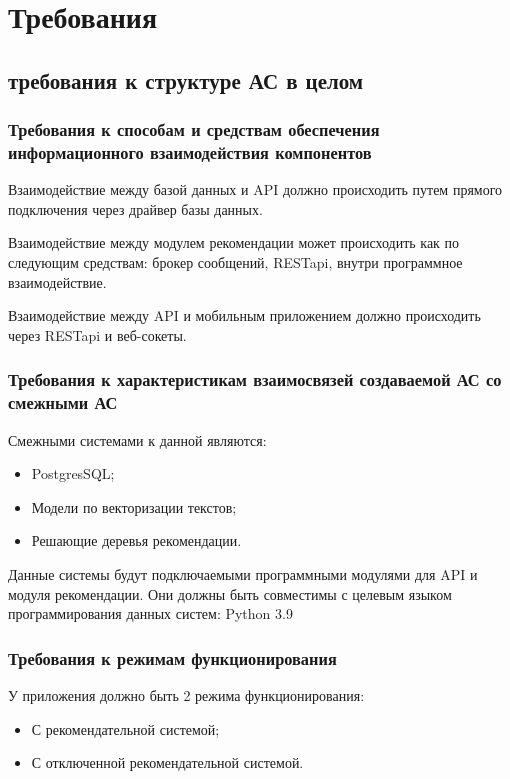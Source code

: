 
\section{Требования}\label{sec:treb}
\subsection{требования к структуре АС в целом}\label{subsec:treb:ob}
\subsubsection{Требования к способам и средствам обеспечения информационного взаимодействия компонентов}
Взаимодействие между базой данных и API должно происходить путем прямого подключения через драйвер базы данных.

Взаимодействие между модулем рекомендации может происходить как по следующим средствам: брокер сообщений, RESTapi,
внутри программное взаимодействие.

Взаимодействие между API и мобильным приложением должно происходить через RESTapi и веб-сокеты.

\subsubsection{Требования к характеристикам взаимосвязей создаваемой АС со смежными АС}
Смежными системами к данной являются:
\begin{itemize}
    \item PostgresSQL;
    \item Модели по векторизации текстов;
    \item Решающие деревья рекомендации.
\end{itemize}

Данные системы будут подключаемыми программными модулями для API и модуля рекомендации.
Они должны быть совместимы с целевым языком программирования данных систем: Python 3.9

\subsubsection{Требования к режимам функционирования}

У приложения должно быть 2 режима функционирования:
\begin{itemize}
    \item С рекомендательной системой;
    \item С отключенной рекомендательной системой.
\end{itemize}

